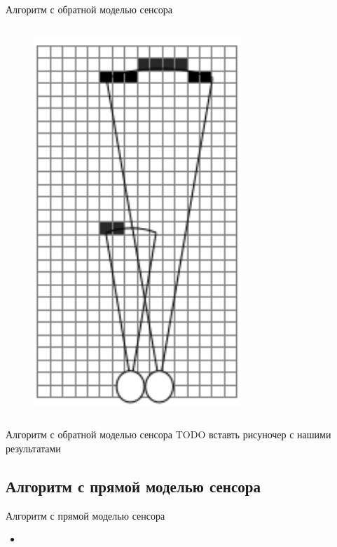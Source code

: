 \documentclass[9pt]{beamer}
\begin{document}
\begin{frame}{Алгоритм с обратной моделью сенсора}
\begin{columns}
\begin{column}{0.33\textwidth}
\begin{figure}[h]
    \includegraphics[width=0.7\textwidth]{inv3.png}
  \end{figure}
\end{column}
\end{columns}
\end{frame}

\begin{frame}{Алгоритм с обратной моделью сенсора}
TODO вставть рисуночер с нашими результатами
\end{frame}

\subsection{Алгоритм с прямой моделью сенсора}
\begin{frame}{Алгоритм с прямой моделью сенсора}
\begin{itemize}
  \item
  {
      
  }
\end{itemize}
\end{frame}
\end{document}
